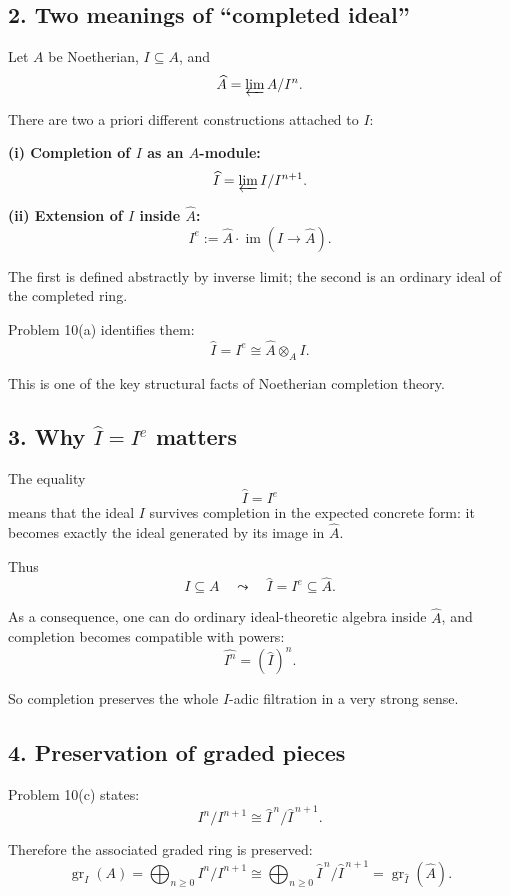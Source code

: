 \documentclass[12pt,a4paper]{article}
\theoremstyle{plain}
\theoremstyle{definition}      %
\begin{document}
	\subsection*{2. Two meanings of ``completed ideal''}
	
	Let \(A\) be Noetherian, \(I\subseteq A\), and
	\[
	\widehat A=\varprojlim A/I^n.
	\]
	
	There are two a priori different constructions attached to \(I\):
	
	\medskip
	\textbf{(i) Completion of \(I\) as an \(A\)-module:}
	\[
	\widehat I=\varprojlim I/I^{n+1}.
	\]
	
	\medskip
	\textbf{(ii) Extension of \(I\) inside \(\widehat A\):}
	\[
	I^e:=\widehat A\cdot \operatorname{im}(I\to \widehat A).
	\]
	
	The first is defined abstractly by inverse limit; the second is an ordinary ideal of the completed ring.
	
	Problem 10(a) identifies them:
	\[
	\widehat I = I^e \cong \widehat A\otimes_A I.
	\]
	
	This is one of the key structural facts of Noetherian completion theory.
	
	\subsection*{3. Why \(\widehat I = I^e\) matters}
	
	The equality
	\[
	\widehat I=I^e
	\]
	means that the ideal \(I\) survives completion in the expected concrete form: it becomes exactly the ideal generated by its image in \(\widehat A\).
	
	Thus
	\[
	I\subseteq A
	\quad\leadsto\quad
	\widehat I=I^e\subseteq \widehat A.
	\]
	
	As a consequence, one can do ordinary ideal-theoretic algebra inside \(\widehat A\), and completion becomes compatible with powers:
	\[
	\widehat{I^n}=(\widehat I)^n.
	\]
	
	So completion preserves the whole \(I\)-adic filtration in a very strong sense.
	
	\subsection*{4. Preservation of graded pieces}
	
	Problem 10(c) states:
	\[
	I^n/I^{n+1}\cong \widehat I^{\,n}/\widehat I^{\,n+1}.
	\]
	
	Therefore the associated graded ring is preserved:
	\[
	\operatorname{gr}_I(A)
	=
	\bigoplus_{n\ge0} I^n/I^{n+1}
	\cong
	\bigoplus_{n\ge0} \widehat I^{\,n}/\widehat I^{\,n+1}
	=
	\operatorname{gr}_{\widehat I}(\widehat A).
	\]
	
\end{document}
